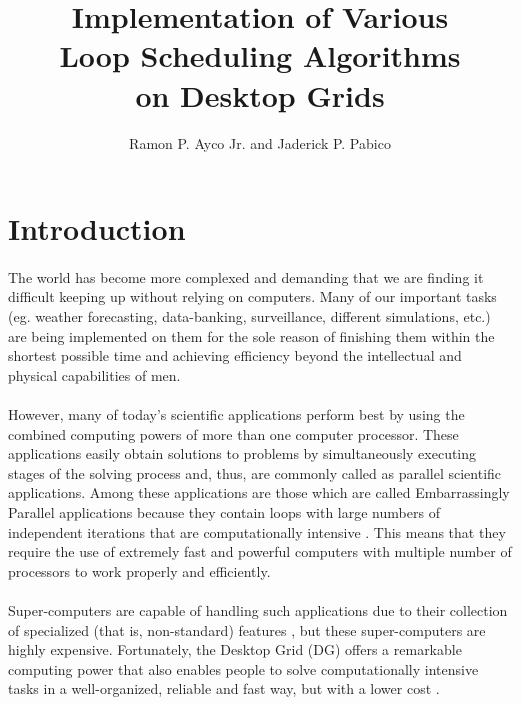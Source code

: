\documentclass[10pt, twocolumn, letterpaper]{article}
\title{\textrm{\textbf{\textup{Implementation of Various\\Loop Scheduling Algorithms\\on Desktop Grids}}}}
\author{Ramon P. Ayco Jr. and Jaderick P. Pabico}
\date{}
\begin{document}
\maketitle

\section{Introduction}

\paragraph{}
The world has become more complexed and demanding that we are finding it difficult keeping up without relying on computers. Many of our important tasks (eg. weather forecasting, data-banking, surveillance, different simulations, etc.) are being implemented on them for the sole reason of finishing them within the shortest possible time and achieving efficiency beyond the intellectual and physical capabilities of men.

\paragraph{}
However, many of today\rq s scientific applications perform best by using the combined computing powers of more than one computer processor. These applications easily obtain solutions to problems by simultaneously executing stages of the solving process \cite{codenotti} and, thus, are commonly called as parallel scientific applications. Among these applications are those which are called Embarrassingly Parallel applications because they contain loops with large numbers of independent iterations that are computationally intensive \cite{pabico}. This means that they require the use of extremely fast and powerful computers with multiple number of processors to work properly and efficiently.

\paragraph{}
Super-computers are capable of handling such applications due to their collection of specialized (that is, non-standard) features \cite{morse}, but these super-computers are highly expensive. Fortunately, the Desktop Grid (DG) offers a remarkable computing power that also enables people to solve computationally intensive tasks in a well-organized, reliable and fast way, but with a lower cost \cite{desktopgrid.hu}.
\end{document}
